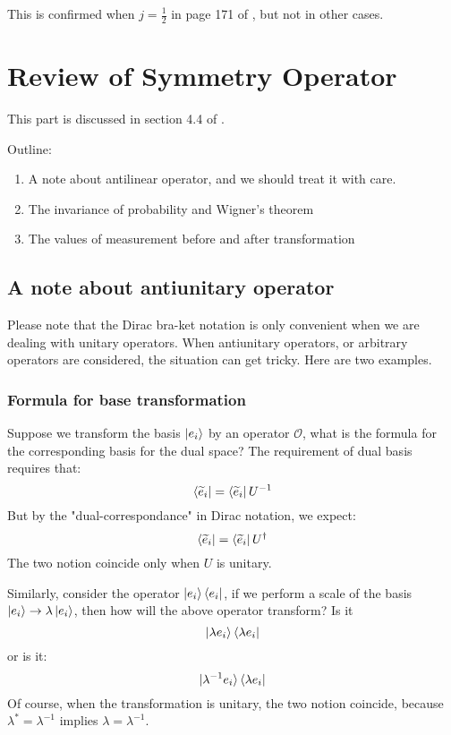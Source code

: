 \documentclass{article}
\numberwithin{equation}{subsection} %
\theoremstyle{definition}
\begin{document}
    This is confirmed when $j=\frac{1}{2}$ in page 171 of \cite{sakurai},
    but not in other cases.
    
\section{Review of Symmetry Operator}
\label{sec:Review-of-Symmetry-Operator}

This part is discussed in section 4.4 of \cite{sakurai}.

Outline:
\begin{enumerate}
    \item A note about antilinear operator, and we should treat it with
        care.
    \item The invariance of probability and Wigner's theorem
    \item The values of measurement before and after transformation
\end{enumerate}

\subsection{A note about antiunitary operator}
\label{sec:A-note-about-antiunitary-operator}
Please note that the Dirac bra-ket notation is only convenient when we are
dealing with unitary operators. When antiunitary operators, or arbitrary
operators are considered, the situation can get tricky. Here are two
examples.

    \subsubsection{Formula for base transformation}
    \label{sec:Formula-for-base-transformation}
    
    Suppose we transform the basis
    $\ket{e_i}$ by an operator $\mathcal{O}$, what is the formula for the
    corresponding basis for the dual space? The requirement of dual basis
    requires that:
    $$ \bra{\widetilde{e}_i} = \bra{\widetilde{e}_i}U^{-1}$$
    But by the "dual-correspondance" in Dirac notation, we expect:
    $$ \bra{\widetilde{e}_i} = \bra{\widetilde{e}_i}U^{\dagger}$$
    The two notion coincide only when $U$ is unitary.

    Similarly, consider the operator $\ket{e_i}\bra{e_i}$, if we perform a
    scale of the basis $\ket{e_i}\to \lambda\ket{e_i}$, then how will the
    above operator transform? Is it
    $$ \ket{\lambda e_i}\bra{\lambda e_i}$$
    or is it:
    $$ \ket{\lambda^{-1} e_i}\bra{\lambda e_i}$$
    Of course, when the transformation is unitary, the two notion
    coincide, because $\lambda^*=\lambda^{-1}$ implies
    $\lambda=\lambda^{-1}$.
\end{document}
